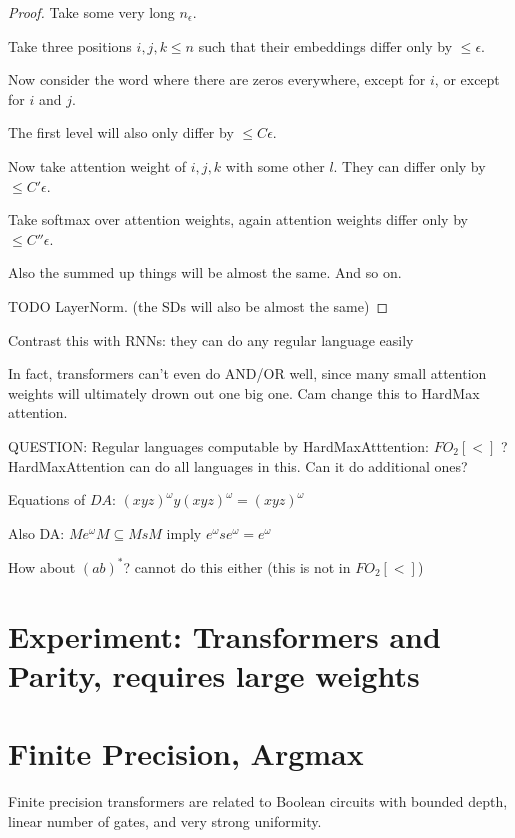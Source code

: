\documentclass[11pt,a4paper]{article}
\begin{document}
\begin{proof}

Take some very long $n_\epsilon$.

Take three positions $i, j, k \leq n$ such that their embeddings differ only by $\leq \epsilon$.

Now consider the word where there are zeros everywhere, except for $i$, or except for $i$ and $j$.

The first level will also only differ by $\leq C \epsilon$.

Now take attention weight of $i,j,k$ with some other $l$. They can differ only by $\leq C' \epsilon$.

Take softmax over attention weights, again attention weights differ only by $\leq C'' \epsilon$.

Also the summed up things will be almost the same. And so on.

TODO LayerNorm. (the SDs will also be almost the same)
\end{proof}

Contrast this with RNNs: they can do any regular language easily

In fact, transformers can't even do AND/OR well, since many small attention weights will ultimately drown out one big one. Cam change this to HardMax attention.

QUESTION: Regular languages computable by HardMaxAtttention: $FO_2[<]$ ? HardMaxAttention can do all languages in this. Can it do additional ones?

Equations of $DA$: $(xyz)^\omega y (xyz)^\omega = (xyz)^\omega$

Also DA: $Me^\omega M \subseteq MsM$ imply $e^\omega s e^\omega = e^\omega$



How about $(ab)^*$? cannot do this either (this is not in $FO_2[<]$)

\section{Experiment: Transformers and Parity, requires large weights}

\section{Finite Precision, Argmax}

Finite precision transformers are related to Boolean circuits with bounded depth, linear number of gates, and very strong uniformity.
\end{document}
